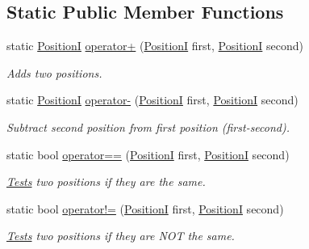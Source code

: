 \subsection*{Static Public Member Functions}
\begin{DoxyCompactItemize}
\item 
static \hyperlink{classCore_1_1Models_1_1PositionI}{Position\+I} \hyperlink{classCore_1_1Models_1_1PositionI_a0217783ab1b5749b63e61bc56f407812}{operator+} (\hyperlink{classCore_1_1Models_1_1PositionI}{Position\+I} first, \hyperlink{classCore_1_1Models_1_1PositionI}{Position\+I} second)
\begin{DoxyCompactList}\small\item\em Adds two positions. \end{DoxyCompactList}\item 
static \hyperlink{classCore_1_1Models_1_1PositionI}{Position\+I} \hyperlink{classCore_1_1Models_1_1PositionI_aadbefbad3c41a124e4adc6c5895ccd0f}{operator-\/} (\hyperlink{classCore_1_1Models_1_1PositionI}{Position\+I} first, \hyperlink{classCore_1_1Models_1_1PositionI}{Position\+I} second)
\begin{DoxyCompactList}\small\item\em Subtract second position from first position (first-\/second). \end{DoxyCompactList}\item 
static bool \hyperlink{classCore_1_1Models_1_1PositionI_a43fff439645b1ce32c9ba087ed9db53c}{operator==} (\hyperlink{classCore_1_1Models_1_1PositionI}{Position\+I} first, \hyperlink{classCore_1_1Models_1_1PositionI}{Position\+I} second)
\begin{DoxyCompactList}\small\item\em \hyperlink{namespaceTests}{Tests} two positions if they are the same. \end{DoxyCompactList}\item 
static bool \hyperlink{classCore_1_1Models_1_1PositionI_a3243525ef665f9aaf5b0dcab58300b27}{operator!=} (\hyperlink{classCore_1_1Models_1_1PositionI}{Position\+I} first, \hyperlink{classCore_1_1Models_1_1PositionI}{Position\+I} second)
\begin{DoxyCompactList}\small\item\em \hyperlink{namespaceTests}{Tests} two positions if they are N\+O\+T the same. \end{DoxyCompactList}\end{DoxyCompactItemize}

